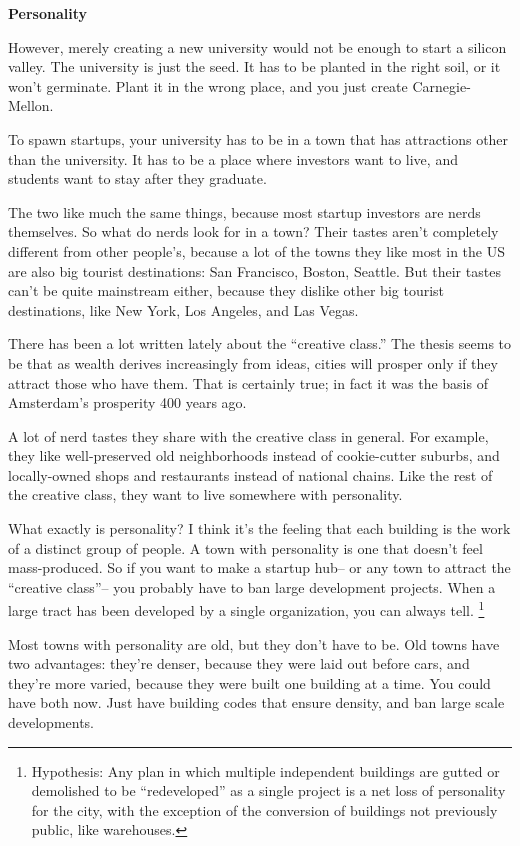 \textbf{Personality}

However, merely creating a new university would not be enough to start a
silicon valley. The university is just the seed. It has to be planted in
the right soil, or it won't germinate. Plant it in the wrong place, and
you just create Carnegie-Mellon.

To spawn startups, your university has to be in a town that has
attractions other than the university. It has to be a place where
investors want to live, and students want to stay after they graduate.

The two like much the same things, because most startup investors are
nerds themselves. So what do nerds look for in a town? Their tastes
aren't completely different from other people's, because a lot of the
towns they like most in the US are also big tourist destinations: San
Francisco, Boston, Seattle. But their tastes can't be quite mainstream
either, because they dislike other big tourist destinations, like New
York, Los Angeles, and Las Vegas.

There has been a lot written lately about the ``creative class.'' The
thesis seems to be that as wealth derives increasingly from ideas,
cities will prosper only if they attract those who have them. That is
certainly true; in fact it was the basis of Amsterdam's prosperity 400
years ago.

A lot of nerd tastes they share with the creative class in general. For
example, they like well-preserved old neighborhoods instead of
cookie-cutter suburbs, and locally-owned shops and restaurants instead
of national chains. Like the rest of the creative class, they want to
live somewhere with personality.

What exactly is personality? I think it's the feeling that each building
is the work of a distinct group of people. A town with personality is
one that doesn't feel mass-produced. So if you want to make a startup
hub-- or any town to attract the ``creative class''-- you probably have
to ban large development projects. When a large tract has been developed
by a single organization, you can always tell. \footnote{Hypothesis: Any plan in which multiple independent buildings are
gutted or demolished to be ``redeveloped'' as a single project is a net
loss of personality for the city, with the exception of the conversion
of buildings not previously public, like warehouses.}

Most towns with personality are old, but they don't have to be. Old
towns have two advantages: they're denser, because they were laid out
before cars, and they're more varied, because they were built one
building at a time. You could have both now. Just have building codes
that ensure density, and ban large scale developments.

